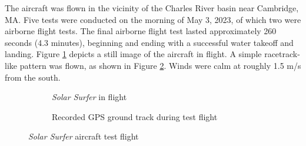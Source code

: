 \documentclass[conf]{new-aiaa}
\begin{document}
    The aircraft was flown in the vicinity of the Charles River basin near Cambridge, MA. Five tests were conducted on the morning of May 3, 2023, of which two were airborne flight tests. The final airborne flight test lasted approximately 260 seconds (4.3 minutes), beginning and ending with a successful water takeoff and landing. Figure \ref{fig:solar_surfer_flight} depicts a still image of the aircraft in flight. A simple racetrack-like pattern was flown, as shown in Figure \ref{fig:solar_surfer_track}. Winds were calm at roughly 1.5 m/s from the south.

    \begin{figure}[H]
        \centering
        \begin{subfigure}[b]{0.45\textwidth}
            \caption{\emph{Solar Surfer} in flight}
            \label{fig:solar_surfer_flight}
        \end{subfigure}
        \hfill
        \begin{subfigure}[b]{0.511\textwidth}
            \caption{Recorded GPS ground track during test flight}
            \label{fig:solar_surfer_track}
        \end{subfigure}
        \caption{\emph{Solar Surfer} aircraft test flight}
        \label{fig:solar_surfer_aircraft}
    \end{figure}
\end{document}
